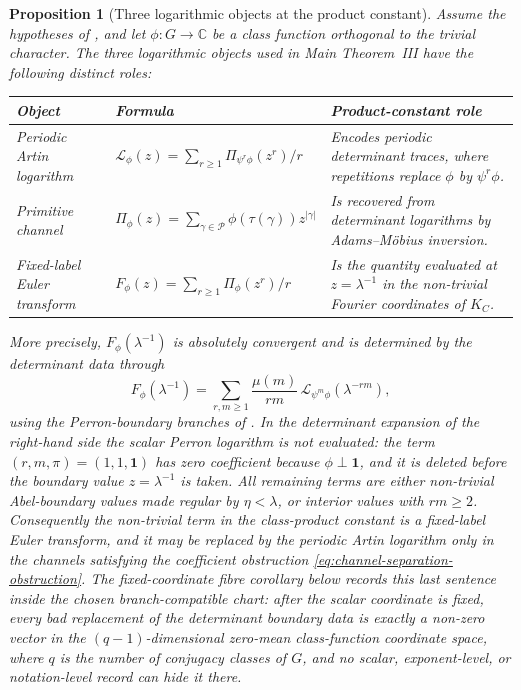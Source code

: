 \documentclass[11pt,a4paper]{amsart}
\theoremstyle{plain}
\newtheorem{proposition}[theorem]{Proposition}
\theoremstyle{definition}
\theoremstyle{remark}
\newcommand{\CC}{\mathbb{C}}
\newcommand{\cP}{\mathcal P}
\begin{document}
\begin{proposition}[Three logarithmic objects at the product constant]
  \label{prop:three-logarithm-product-interface}
  Assume the hypotheses of , and let
  \(\phi:G\to\CC\) be a class function orthogonal to the trivial
  character.  The three logarithmic objects used in Main Theorem~III have
  the following distinct roles:
  \begin{center}
  \begin{tabular}{@{}L{0.25\textwidth}L{0.36\textwidth}L{0.29\textwidth}@{}}
  \toprule
  Object & Formula & Product-constant role \\
  \midrule
  Periodic Artin logarithm
  & \(\mathcal L_\phi(z)=\sum_{r\ge1}\Pi_{\psi^r\phi}(z^r)/r\)
  & Encodes periodic determinant traces, where repetitions replace
    \(\phi\) by \(\psi^r\phi\). \\
  Primitive channel
  & \(\Pi_\phi(z)=\sum_{\gamma\in\cP}\phi(\tau(\gamma))z^{|\gamma|}\)
  & Is recovered from determinant logarithms by Adams--M\"obius inversion. \\
  Fixed-label Euler transform
  & \(F_\phi(z)=\sum_{r\ge1}\Pi_\phi(z^r)/r\)
  & Is the quantity evaluated at \(z=\lambda^{-1}\) in the non-trivial
    Fourier coordinates of \(K_C\). \\
  \bottomrule
  \end{tabular}
  \end{center}
  More precisely, \(F_\phi(\lambda^{-1})\) is absolutely convergent and is
  determined by the determinant data through
  \begin{equation}\label{eq:three-logarithm-product-interface}
    F_\phi(\lambda^{-1})
    =
    \sum_{r,m\ge1}\frac{\mu(m)}{rm}\,
      \mathcal L_{\psi^m\phi}(\lambda^{-rm}),
  \end{equation}
  using the Perron-boundary branches of .
  In the determinant expansion of the right-hand side the scalar Perron
  logarithm is not evaluated: the term \((r,m,\pi)=(1,1,\mathbf1)\) has zero
  coefficient because \(\phi\perp\mathbf1\), and it is deleted before the
  boundary value \(z=\lambda^{-1}\) is taken.  All remaining terms are either
  non-trivial Abel-boundary values made regular by \(\eta<\lambda\), or
  interior values with \(rm\ge2\).
  Consequently the non-trivial term in the class-product constant is a
  fixed-label Euler transform, and it may be replaced by the periodic
  Artin logarithm only in the channels satisfying the coefficient
  obstruction \eqref{eq:channel-separation-obstruction}.
  The fixed-coordinate fibre corollary
   below records this
  last sentence inside the chosen branch-compatible chart: after the
  scalar coordinate is fixed, every bad replacement of the determinant
  boundary data is exactly a non-zero vector in the \((q-1)\)-dimensional
  zero-mean class-function coordinate space, where \(q\) is the number of
  conjugacy classes of \(G\), and no scalar, exponent-level, or
  notation-level record can hide it there.
\end{proposition}
\end{document}
